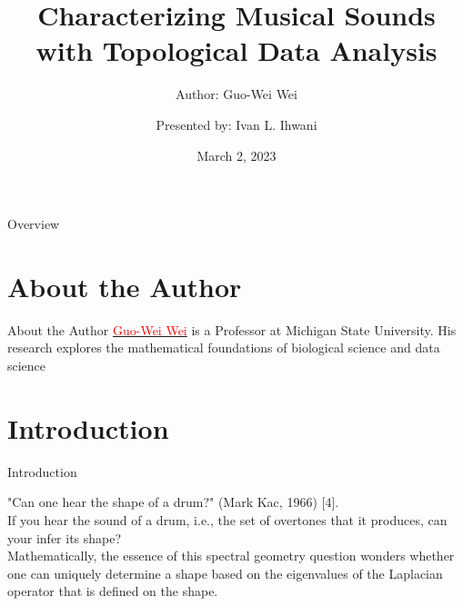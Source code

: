 \documentclass[aspectratio=169,xcolor=dvipsnames]{beamer}
\title[Char. Musical Sounds with TDA]{Characterizing Musical Sounds with Topological Data Analysis} %
\subtitle{Author: Guo-Wei Wei}
\author[Ivan L. Ihwani]{Presented by: Ivan L. Ihwani}
\institute[SIAM NEWS MARCH 2023]{Department of Mathematics \newline National Central University}
\date{March 2, 2023} %
\begin{document}
\begin{frame}[plain]
    \titlepage
\end{frame}

\begin{frame}{Overview}
    \tableofcontents
\end{frame}

\section{About the Author}
\begin{frame}{About the Author}
\href{https://users.math.msu.edu/users/weig/}{\textcolor{red}{Guo-Wei Wei}} is a Professor at Michigan State University. His research explores the mathematical foundations of biological science and data science
\end{frame}


\section{Introduction}
\begin{frame}{Introduction}
\begin{small}
"Can one hear the shape of a drum?" (Mark Kac, 1966) [4].\\
\vspace{1.5em}
If you hear the sound of a drum, i.e., the set of overtones that it produces, can your infer its shape?\\
\vspace{1.5em}
Mathematically, the essence of this spectral geometry question wonders whether one can uniquely determine a shape based on the eigenvalues of the Laplacian operator that is defined on the shape.
\end{small}
\end{frame}
\end{document}
